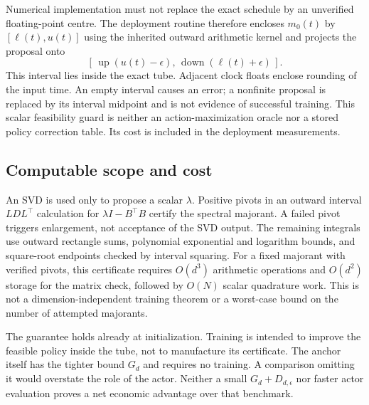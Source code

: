 Numerical implementation must not replace the exact schedule by an unverified floating-point centre. The deployment routine therefore encloses $m_0(t)$ by $[\ell(t),u(t)]$ using the inherited outward arithmetic kernel and projects the proposal onto
\begin{equation}\label{eq:r10inward}
 [\,\operatorname{up}(u(t)-\epsilon),\,
       \operatorname{down}(\ell(t)+\epsilon)\,].
\end{equation}
This interval lies inside the exact tube. Adjacent clock floats enclose rounding of the input time. An empty interval causes an error; a nonfinite proposal is replaced by its interval midpoint and is not evidence of successful training. This scalar feasibility guard is neither an action-maximization oracle nor a stored policy correction table. Its cost is included in the deployment measurements.

\subsection{Computable scope and cost}
An SVD is used only to propose a scalar $\lambda$. Positive pivots in an outward interval $LDL^\top$ calculation for $\lambda I-B^\top B$ certify the spectral majorant. A failed pivot triggers enlargement, not acceptance of the SVD output. The remaining integrals use outward rectangle sums, polynomial exponential and logarithm bounds, and square-root endpoints checked by interval squaring. For a fixed majorant with verified pivots, this certificate requires $O(d^3)$ arithmetic operations and $O(d^2)$ storage for the matrix check, followed by $O(N)$ scalar quadrature work. This is not a dimension-independent training theorem or a worst-case bound on the number of attempted majorants.

The guarantee holds already at initialization. Training is intended to improve the feasible policy inside the tube, not to manufacture its certificate. The anchor itself has the tighter bound $G_d$ and requires no training. A comparison omitting it would overstate the role of the actor. Neither a small $G_d+D_{d,\epsilon}$ nor faster actor evaluation proves a net economic advantage over that benchmark.

